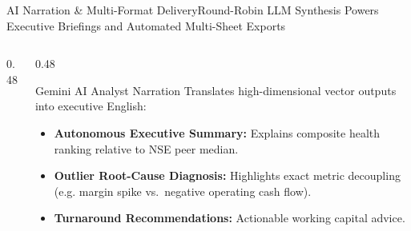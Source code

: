 \begin{frame}{AI Narration \& Multi-Format Delivery}{Round-Robin LLM Synthesis Powers Executive Briefings and Automated Multi-Sheet Exports}
\begin{columns}[T]
\begin{column}{0.48\textwidth}
\begin{tcolorbox}
                \vfill
            \end{tcolorbox}
        \end{column}

        \begin{column}{0.48\textwidth}
            \begin{quantcard}[height=2.7cm]{Gemini AI Analyst Narration}
                \fontsize{6.3pt}{7.9pt}\selectfont
                Translates high-dimensional vector outputs into executive English:
                \begin{itemize}
                    \setlength{\itemsep}{1.5pt}
                    \item \textbf{Autonomous Executive Summary:} Explains composite health ranking relative to NSE peer median.
                    \item \textbf{Outlier Root-Cause Diagnosis:} Highlights exact metric decoupling (e.g. margin spike vs.\ negative operating cash flow).
                    \item \textbf{Turnaround Recommendations:} Actionable working capital advice.
                \end{itemize}
            \end{quantcard}

            \vspace{0.1cm}


\end{column}
\end{columns}
\end{frame}
